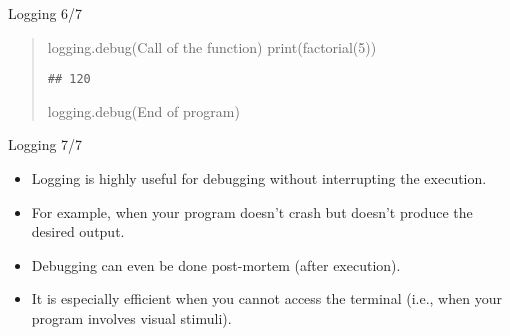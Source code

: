 \documentclass[
  8pt,
  ignorenonframetext,
]{beamer}
\newenvironment{Shaded}{\begin{snugshade}}{\end{snugshade}}
\newcommand{\BuiltInTok}[1]{#1}
\newcommand{\DecValTok}[1]{\textcolor[rgb]{0.00,0.00,0.81}{#1}}
\newcommand{\NormalTok}[1]{#1}
\newcommand{\StringTok}[1]{\textcolor[rgb]{0.31,0.60,0.02}{#1}}
\begin{document}
\begin{frame}[fragile]{Logging 6/7}
\begin{quote}
\begin{Shaded}
\begin{Highlighting}[]
\NormalTok{logging.debug(}\StringTok{\textquotesingle{}Call of the function\textquotesingle{}}\NormalTok{)}
\BuiltInTok{print}\NormalTok{(factorial(}\DecValTok{5}\NormalTok{))}
\end{Highlighting}
\end{Shaded}

\begin{verbatim}
## 120
\end{verbatim}

\begin{Shaded}
\begin{Highlighting}[]

\NormalTok{logging.debug(}\StringTok{\textquotesingle{}End of program\textquotesingle{}}\NormalTok{)}
\end{Highlighting}
\end{Shaded}
\end{quote}
\end{frame}

\begin{frame}{Logging 7/7}
\protect\hypertarget{logging-77}{}
\begin{itemize}
\item
  Logging is highly useful for debugging without interrupting the
  execution.
\item
  For example, when your program doesn't crash but doesn't produce the
  desired output.
\item
  Debugging can even be done post-mortem (after execution).
\item
  It is especially efficient when you cannot access the terminal (i.e.,
  when your program involves visual stimuli).
\end{itemize}
\end{frame}
\end{document}
